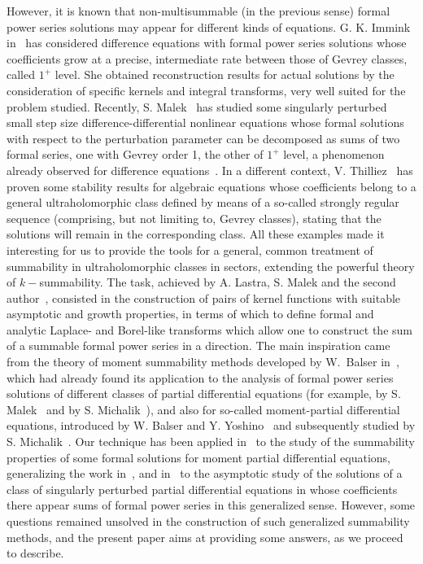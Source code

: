 \documentclass[11pt,a4paper]{article}
\theoremstyle{definition}
\begin{document}
However, it is known that non-multisummable (in the previous sense) formal power series solutions may appear for different kinds of equations. G. K. Immink in~\cite{Immink,Immink2} has considered difference equations with formal power series solutions whose coefficients grow at a precise, intermediate rate between those of Gevrey classes, called $1^+$ level. She obtained reconstruction results for actual solutions by the consideration of specific kernels and integral transforms, very well suited for the problem studied.
Recently, S. Malek~\cite{Malek4} has studied some singularly perturbed small step size difference-differential nonlinear equations whose formal solutions with respect to the perturbation parameter can be decomposed as sums of two formal series, one with Gevrey order 1, the other of $1^+$ level, a phenomenon already observed for difference equations~\cite{BraaksmaFaberImmink}. In a different context, V. Thilliez~\cite{Thilliez2} has proven some stability results for algebraic equations whose coefficients belong to a general ultraholomorphic class defined by means of a so-called strongly regular sequence (comprising, but not limiting to, Gevrey classes), stating that the solutions will remain in the corresponding class. All these examples made it interesting for us to provide the tools for a general, common treatment of summability in ultraholomorphic classes in sectors, extending the powerful theory of $k-$summability.
The task, achieved by A. Lastra, S. Malek and the second author~\cite{lastramaleksanz3}, consisted in the construction of pairs of kernel functions with suitable asymptotic and growth properties, in terms of which to define formal and analytic Laplace- and Borel-like transforms which allow one to construct the sum of a summable formal power series in a direction. The main inspiration came from the theory of moment summability methods developed by W.~Balser in~\cite[Section\ 5.5]{Balserutx}, which had already found its application to the analysis of formal power series solutions of different classes of partial differential equations
(for example, by S. Malek~\cite{Malek2} and by S. Michalik~\cite{Michalik2}), and also for so-called moment-partial differential equations, introduced by W. Balser and Y. Yoshino~\cite{BalserYoshino} and subsequently studied by S. Michalik~\cite{Michalik3,Michalik4}.
Our technique has been applied in~\cite{lastramaleksanz3} to the study of the summability properties of some formal solutions for moment partial differential equations, generalizing the work in~\cite{Michalik3}, and in~\cite{lastramaleksanz4} to the asymptotic study of the solutions of a class of singularly perturbed partial differential equations in whose coefficients there appear sums of formal power series in this generalized sense. However, some questions remained unsolved in the construction of such generalized summability methods, and the present paper aims at providing some answers, as we proceed to describe.
\end{document}
